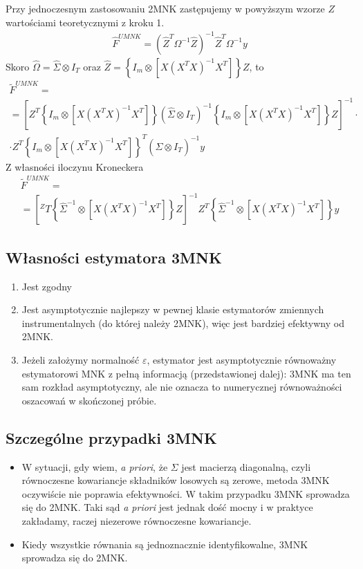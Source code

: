 Przy jednoczesnym zastosowaniu 2MNK zastępujemy w powyższym wzorze $ Z $ wartościami teoretycznymi z kroku 1.
\begin{gather*}
\hat F^{UMNK}=
\left(\hat Z^T\Omega^{-1}\hat Z\right)^{-1}
\hat Z^T\Omega^{-1}y
\end{gather*}
Skoro $ \hat \Omega=\hat \Sigma\otimes I_T $ oraz $ \hat Z=\left\{I_m\otimes\left[X\left(X^TX\right)^{-1}X^T\right]\right\}Z $, to
\begin{gather*}
\tilde{F}^{UMNK}
=\\=
\left[Z^T\left\{I_m\otimes\left[X\left(X^TX\right)^{-1}X^T\right]\right\}
\left(\hat \Sigma\otimes I_T\right)^{-1}
\left\{I_m\otimes\left[X\left(X^TX\right)^{-1}X^T\right]\right\}Z\right]^{-1}
\cdot\\\cdot
Z^T\left\{I_m\otimes\left[X\left(X^TX\right)^{-1}X^T\right]\right\}^T
\left(\hat \Sigma\otimes I_T\right)^{-1}y
\end{gather*}
Z własności iloczynu Kroneckera
\begin{gather*}
\tilde{F}^{UMNK}
=\\=
\left[^ZT\left\{\hat \Sigma^{-1}\otimes\left[X\left(X^TX\right)^{-1}X^T\right]\right\}Z\right]^{-1}
Z^T
\left\{\hat \Sigma^{-1}\otimes\left[X\left(X^TX\right)^{-1}X^T\right]\right\}y
\end{gather*}
\subsection{Własności estymatora 3MNK}
\begin{enumerate}
\item Jest zgodny
\item Jest asymptotycznie najlepszy w pewnej klasie estymatorów zmiennych instrumentalnych (do której należy 2MNK), więc jest bardziej efektywny od 2MNK.
\item Jeżeli założymy normalność $ \varepsilon $, estymator jest asymptotycznie  równoważny estymatorowi MNK z pełną informacją (przedstawionej dalej): 3MNK ma ten sam rozkład asymptotyczny, ale nie oznacza to numerycznej równoważności oszacowań w skończonej próbie.
\end{enumerate}
\subsection{Szczególne przypadki 3MNK}
\begin{itemize}
\item W sytuacji, gdy wiem, \textit{a priori}, że $ \Sigma $ jest macierzą diagonalną, czyli równoczesne kowariancje składników losowych są zerowe, metoda 3MNK oczywiście nie poprawia efektywności. W takim przypadku 3MNK sprowadza się do 2MNK. Taki sąd \textit{a priori} jest jednak dość mocny i w praktyce zakładamy, raczej niezerowe równoczesne kowariancje.
\item Kiedy wszystkie równania są jednoznacznie identyfikowalne, 3MNK sprowadza się do 2MNK.
\end{itemize}
